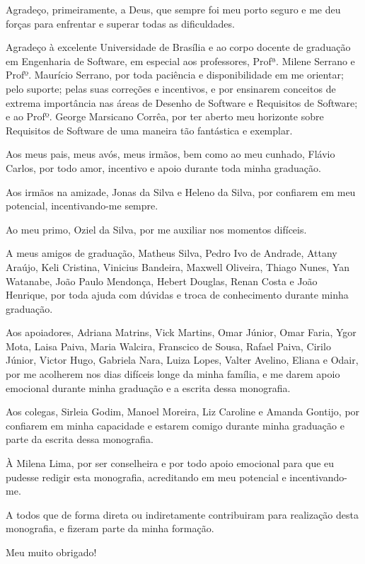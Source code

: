 \begin{agradecimentos}

	Agradeço, primeiramente, a Deus, que sempre foi meu porto seguro e me deu forças para enfrentar e superar todas as dificuldades.
	 
	Agradeço à excelente Universidade de Brasília e ao corpo docente de graduação em Engenharia de Software, em especial aos professores, Profª. Milene Serrano e Profº. Maurício Serrano, por toda paciência e disponibilidade em me orientar; pelo suporte; pelas suas correções e incentivos, e por ensinarem conceitos de extrema importância nas áreas de Desenho de Software e Requisitos de Software; e ao Profº. George Marsicano Corrêa, por ter aberto meu horizonte sobre Requisitos de Software de uma maneira tão fantástica e exemplar.
	
	Aos meus pais, meus avós, meus irmãos, bem como ao meu cunhado, Flávio Carlos, por todo amor, incentivo e apoio durante toda minha graduação. 
	
	Aos irmãos na amizade, Jonas da Silva e Heleno da Silva, por confiarem em meu potencial, incentivando-me sempre. 
	
	Ao meu primo, Oziel da Silva, por me auxiliar nos momentos difíceis. 
	
	A meus amigos de graduação, Matheus Silva, Pedro Ivo de Andrade, Attany Araújo, Keli Cristina, Vinicius Bandeira, Maxwell Oliveira, Thiago Nunes, Yan Watanabe, João Paulo Mendonça, Hebert Douglas, Renan Costa e João Henrique, por toda ajuda com dúvidas e troca de conhecimento durante minha graduação. 
	
	Aos apoiadores, Adriana Matrins, Vick Martins, Omar Júnior, Omar Faria, Ygor Mota, Laisa Paiva, Maria Walcira, Franscico de Sousa, Rafael Paiva, Cirilo Júnior, Victor Hugo, Gabriela Nara, Luiza Lopes, Valter Avelino, Eliana e Odair,  por me acolherem nos dias difíceis longe da minha família,  e me darem apoio emocional durante minha graduação e a escrita dessa monografia. 
	
	Aos colegas, Sirleia Godim, Manoel Moreira, Liz Caroline e Amanda Gontijo, por confiarem em minha capacidade e estarem comigo durante minha graduação e parte da escrita dessa monografia. 
	
	À Milena Lima, por ser conselheira e por todo apoio emocional para que eu pudesse redigir esta monografia, acreditando em meu potencial e incentivando-me.
	
	A todos que de forma direta ou indiretamente contribuiram para realização desta monografia, e fizeram parte da minha formação. 
	
	Meu muito obrigado!  
	
\end{agradecimentos}
